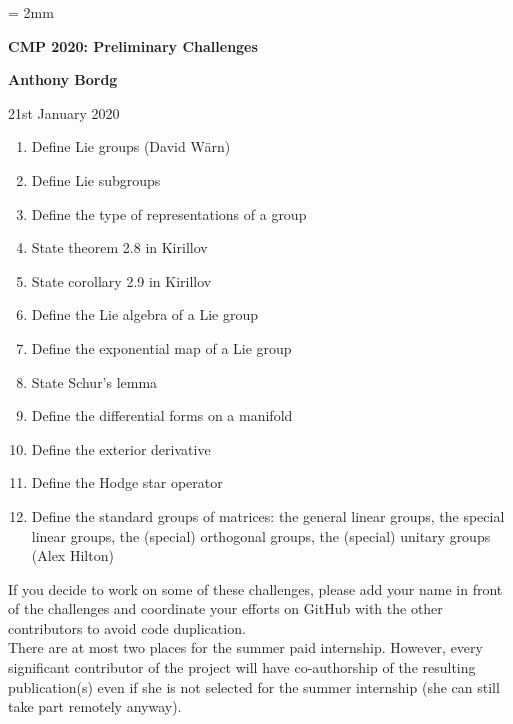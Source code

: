 \documentclass[12pt]{article}
\begin{document}
%
\parskip = 2mm
\begin{center}
{\bf\Large CMP 2020: Preliminary Challenges}

\vspace{3mm}

{\large\bf Anthony Bordg}
\vspace {3mm}

{21st January 2020}  
\end{center}

\begin{enumerate}
	\item Define Lie groups	(David W\"arn)
	\item Define Lie subgroups
	\item Define the type of representations of a group
	\item State theorem 2.8 in Kirillov
	\item State corollary 2.9 in Kirillov
	\item Define the Lie algebra of a Lie group
	\item Define the exponential map of a Lie group
	\item State Schur's lemma
	\item Define the differential forms on a manifold
	\item Define the exterior derivative
	\item Define the Hodge star operator
	\item Define the standard groups of matrices: the general linear groups, the special linear groups, the (special) orthogonal groups, the (special) unitary groups (Alex Hilton)
\end{enumerate}

If you decide to work on some of these challenges, please add your name in front of the challenges and coordinate your efforts on GitHub with the other contributors to avoid code duplication. \\
There are at most two places for the summer paid internship. However, every significant contributor of the project will have co-authorship of the resulting publication(s) even if she is not selected for the summer internship (she can still take part remotely anyway).
\end{document}

